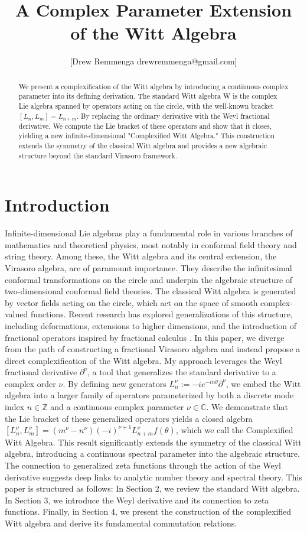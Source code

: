 \documentclass{artjltcopy}
\title{A Complex Parameter Extension of the Witt Algebra}
\author{[Drew Remmenga drewremmenga@gmail.com]}
\newcommand{\?}{\textbackslash}
\newcommand{\C}{\mathbb{C}}
\newcommand{\Z}{\mathbb{Z}}
\begin{document}
\maketitle
\begin{abstract}
  We present a complexification of the Witt algebra by introducing a continuous complex parameter into its defining derivation. The standard Witt algebra W is the complex Lie algebra spanned by operators acting on the circle, with the well-known bracket $[L_n,L_m]= L_{n+m}$. 
  By replacing the ordinary derivative with the Weyl fractional derivative. We compute the Lie bracket of these operators and show that it closes, yielding a new infinite-dimensional "Complexified Witt Algebra." 
  This construction extends the symmetry of the classical Witt algebra and provides a new algebraic structure beyond the standard Virasoro framework.
  \end{abstract}
\section{Introduction}
Infinite-dimensional Lie algebras play a fundamental role in various branches of mathematics and theoretical physics, most notably in conformal field theory and string theory. Among these, the Witt algebra and its central extension, the Virasoro algebra, are of paramount importance. They describe the infinitesimal conformal transformations on the circle and underpin the algebraic structure of two-dimensional conformal field theories.\cite{Schottenloher1997}
The classical Witt algebra is generated by vector fields acting on the circle, which act on the space of smooth complex-valued functions. Recent research has explored generalizations of this structure, including deformations, extensions to higher dimensions, and the introduction of fractional operators inspired by fractional calculus \cite{pakianathan2010generalizedwittalgebrasvariable}\cite{La_Nave_2019}.
In this paper, we diverge from the path of constructing a fractional Virasoro algebra and instead propose a direct complexification of the Witt algebra. My approach leverages the Weyl fractional derivative $\partial^\nu$, a tool that generalizes the standard derivative to a complex order $\nu$. By defining new generators $L^\nu_n:= -i e^{-i n \theta}\partial^\nu$, we embed the Witt algebra into a larger family of operators parameterized by both a discrete mode index $n\in \Z$
 and a continuous complex parameter $\nu \in \C$.
We demonstrate that the Lie bracket of these generalized operators yields a closed algebra $[L^\nu_n,L^\nu_m]=(m^{\nu} - n^\nu )(-i)^{\nu+1} L^{\nu}_{n+m} f(\theta)$, 
which we call the Complexified Witt Algebra. 
This result significantly extends the symmetry of the classical Witt algebra, introducing a continuous spectral parameter into the algebraic structure. The connection to generalized zeta functions through the action of the Weyl derivative suggests deep links to analytic number theory and spectral theory.
This paper is structured as follows: In Section 2, we review the standard Witt algebra. In Section 3, we introduce the Weyl derivative and its connection to zeta functions. Finally, in Section 4, we present the construction of the complexified Witt algebra and derive its fundamental commutation relations.
\end{document}
